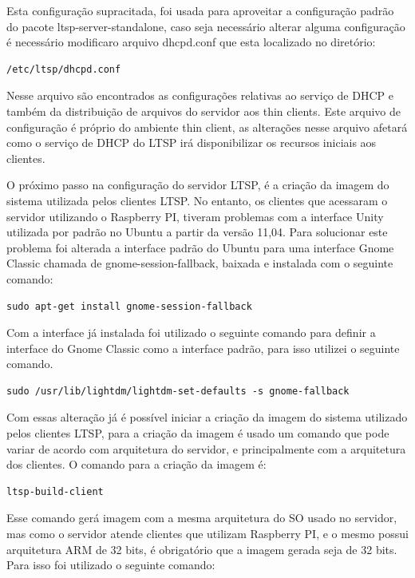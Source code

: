 \documentclass[
	12pt,				%
	openright,			%
	twoside,			%
	a4paper,			%
	chapter=TITLE,		%
	english,			%
	brazil				%
	]{abntex2}
\begin{document}
Esta configuração supracitada, foi usada para aproveitar a configuração padrão  do pacote ltsp-server-standalone, caso seja necessário alterar alguma configuração é necessário modificaro arquivo dhcpd.conf que esta localizado no diretório:

\begin{verbatim}
/etc/ltsp/dhcpd.conf
\end{verbatim}

Nesse arquivo são encontrados as configurações relativas ao serviço de DHCP e também da distribuição de arquivos do servidor aos thin clients. Este arquivo de configuração é próprio do ambiente thin client, as alterações nesse arquivo afetará como o  serviço de DHCP do LTSP irá disponibilizar os recursos iniciais aos clientes.

O próximo passo na configuração do servidor LTSP, é a criação da imagem do sistema utilizada pelos clientes LTSP. No entanto, os clientes que acessaram o servidor utilizando o Raspberry PI, tiveram problemas com a interface Unity utilizada por padrão no Ubuntu a partir da versão 11,04. Para solucionar este problema foi alterada a interface padrão do Ubuntu para uma interface Gnome Classic chamada de gnome-session-fallback, baixada e instalada com o seguinte comando:

\begin{verbatim}
sudo apt-get install gnome-session-fallback
\end{verbatim}

Com a interface já instalada foi utilizado o seguinte comando para definir a interface do Gnome Classic como a interface padrão, para isso utilizei o seguinte comando.

\begin{verbatim}
sudo /usr/lib/lightdm/lightdm-set-defaults -s gnome-fallback
\end{verbatim}

Com essas alteração já é possível iniciar a criação da imagem do sistema utilizado pelos  clientes LTSP, para a criação da imagem é usado um comando que pode variar de acordo com arquitetura do servidor, e principalmente com a arquitetura dos clientes. O comando para a criação da imagem é:


\begin{verbatim}
ltsp-build-client
\end{verbatim}

Esse comando gerá imagem com a mesma arquitetura do SO usado no servidor, mas como o servidor atende clientes que utilizam Raspberry PI, e o mesmo possui arquitetura ARM de 32 bits, é obrigatório que a imagem gerada seja de 32 bits. Para isso  foi utilizado o seguinte comando:
\end{document}
